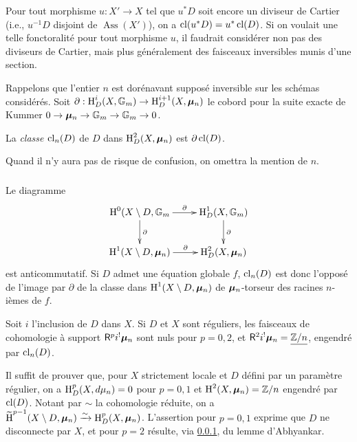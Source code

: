 Pour tout morphisme $u:X'\to X$ tel que $u^* D$ soit encore un diviseur de 
Cartier (i.e., $u^{-1} D$ disjoint de $\operatorname{Ass}(X')$), on a 
$\operatorname{cl}(u^* D) = u^*\operatorname{cl}(D)$. Si on voulait une telle 
fonctoralit\'e pour tout morphisme $u$, il faudrait consid\'erer non pas des 
diviseurs de Cartier, mais plus g\'en\'eralement des faisceaux inversibles 
munis d'une section.

Rappelons que l'entier $n$ est dor\'enavant suppos\'e inversible sur les 
sch\'emas consid\'er\'es. Soit 
$\partial:\operatorname{H}_D^i(X,\mathbb{G}_m) \to \operatorname{H}_D^{i+1}(X,{\bm\mu}_n)$ le cobord pour la suite 
exacte de Kummer $0 \to {\bm\mu}_n \to \mathbb{G}_m \to \mathbb{G}_m \to 0$.





\begin{definition}\label{IV:2-1-2}
La \emph{classe $\operatorname{cl}_n(D)$} de $D$ dans $\operatorname{H}_D^2(X,{\bm\mu}_n)$ est 
$\partial \operatorname{cl}(D)$. 
\end{definition}

Quand il n'y aura pas de risque de confusion, on omettra la mention de $n$. 





\subsubsection{}\label{IV:2-1-3}

Le diagramme 
\[\xymatrix{
  \h^0(X\setminus D,\dG_m \ar[r]^-\partial \ar[d]^-\partial 
    & \h_D^1(X,\dG_m) \ar[d]^-\partial \\
  \h^1(X\setminus D,\dmu_n) \ar[r]^-\partial 
    & \h_D^2(X,\dmu_n)
}\]
est anticommutatif. Si $D$ admet une \'equation globale $f$, 
$\operatorname{cl}_n(D)$ est donc l'oppos\'e de l'image par $\partial$ de la 
classe dans $\operatorname{H}^1(X\setminus D,{\bm\mu}_n)$ de ${\bm\mu}_n$-torseur des racines 
$n$-i\`emes de $f$. 





\begin{proposition}\label{IV:2-1-4}
Soit $i$ l'inclusion de $D$ dans $X$. Si $D$ et $X$ sont r\'eguliers, les 
faisceaux de cohomologie \`a support $\mathsf{R}^p i^! {\bm\mu}_n$ sont nuls pour $p=0,2$, 
et $\mathsf{R}^2 i^!{\bm\mu}_n = \underline{\mathbb{Z}/n}$, engendr\'e par 
$\operatorname{cl}_n(D)$. 
\end{proposition}

Il suffit de prouver que, pour $X$ strictement locale et $D$ d\'efini par un 
param\`etre r\'egulier, on a $\operatorname{H}_D^p(X,d\mu_n) = 0$ pour $p=0,1$ et 
$\operatorname{H}^2(X,{\bm\mu}_n) = \mathbb{Z}/n$ engendr\'e par $\operatorname{cl}(D)$. Notant par 
$\sim$ la cohomologie r\'eduite, on a 
$\widetilde{\operatorname{H}}^{p-1}(X\setminus D,{\bm\mu}_n)\xrightarrow\sim \operatorname{H}_D^p(X,{\bm\mu}_n)$. L'assertion 
pour $p=0,1$ exprime que $D$ ne disconnecte par $X$, et pour $p=2$ r\'esulte, 
via \ref{IV:2-1-3}, du lemme d'Abhyankar. 

